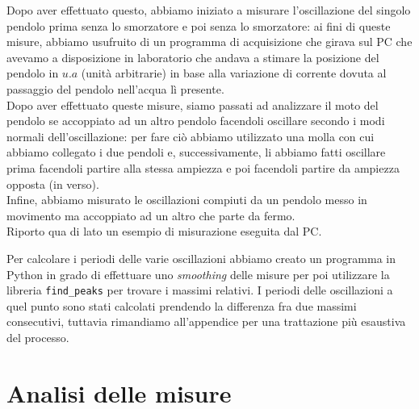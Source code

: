 \documentclass{article}
\begin{document}
\begin{minipage}{0.49\textwidth}
Dopo aver effettuato questo, abbiamo iniziato a misurare l'oscillazione del singolo pendolo prima senza lo smorzatore e poi senza lo smorzatore: ai fini di queste misure, abbiamo usufruito di un programma di acquisizione che girava sul PC che avevamo a disposizione in laboratorio che andava a stimare la posizione del pendolo in $u.a$ (unità arbitrarie) in base alla variazione di corrente dovuta al passaggio del pendolo nell'acqua lì presente. \\
Dopo aver effettuato queste misure, siamo passati ad analizzare il moto del pendolo se accoppiato ad un altro pendolo facendoli oscillare secondo i modi normali dell'oscillazione: per fare ciò abbiamo utilizzato una molla con cui abbiamo collegato i due pendoli e, successivamente, li abbiamo fatti oscillare prima facendoli partire alla stessa ampiezza e poi facendoli partire da ampiezza opposta (in verso). \\
Infine, abbiamo misurato le oscillazioni compiuti da un pendolo messo in movimento ma accoppiato ad un altro che parte da fermo. \\
Riporto qua di lato un esempio di misurazione eseguita dal PC.
\end{minipage}
Per calcolare i periodi delle varie oscillazioni abbiamo creato un programma in Python in grado di effettuare uno \emph{smoothing} delle misure per poi utilizzare la libreria \texttt{find\_peaks} per trovare i massimi relativi. I periodi delle oscillazioni a quel punto sono stati calcolati prendendo la differenza fra due massimi consecutivi, tuttavia rimandiamo all'appendice per una trattazione più esaustiva del processo.

\section{Analisi delle misure}
\end{document}
